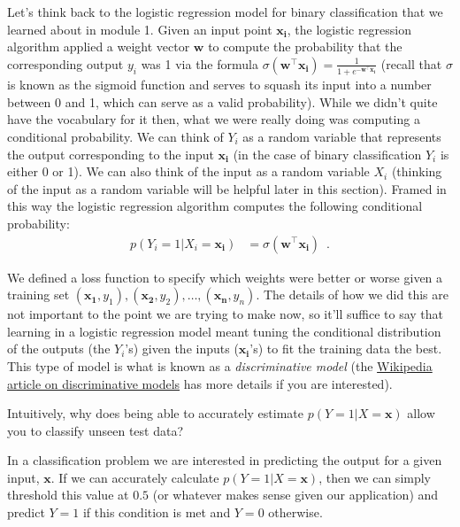\documentclass[assignment03_Solutions]{subfiles}
\begin{document}
Let's think back to the logistic regression model for binary classification that we learned about in module 1.  Given an input point $\mathbf{x_i}$, the logistic regression algorithm applied a weight vector $\mathbf{w}$ to compute the probability that the corresponding output $y_i$ was 1 via the formula $\sigma(\mathbf{w}^\top \mathbf{x_i}) = \frac{1}{1+e^{-\mathbf{w}^\top \mathbf{x_i}}}$ (recall that $\sigma$ is known as the sigmoid function and serves to squash its input into a number between 0 and 1, which can serve as a valid probability).  While we didn't quite have the vocabulary for it then, what we were really doing was computing a conditional probability.  We can think of $Y_i$ as a random variable that represents the output corresponding to the input $\mathbf{x_i}$ (in the case of binary classification $Y_i$ is either 0 or 1).  We can also think of the input as a random variable $X_i$ (thinking of the input as a random variable will be helpful later in this section).  Framed in this way the logistic regression algorithm computes the following conditional probability:
\begin{align}
p(Y_i = 1 | X_i = \mathbf{x_i}) &= \sigma(\mathbf{w}^\top \mathbf{x_i}) \enspace .
\end{align}

We defined a loss function to specify which weights were better or worse given a training set $(\mathbf{x_1}, y_1), (\mathbf{x_2}, y_2), \ldots, (\mathbf{x_n}, y_n)$.  The details of how we did this are not important to the point we are trying to make now, so it'll suffice to say that learning in a logistic regression model meant tuning the conditional distribution of the outputs (the $Y_i$'s) given the inputs ($\mathbf{x_i}$'s) to fit the training data the best.  This type of model is what is known as a \emph{discriminative model} (the \href{https://en.wikipedia.org/wiki/Discriminative_model}{Wikipedia article on discriminative models} has more details if you are interested).

\vspace{1em}

\begin{understandingcheck}
Intuitively, why does being able to accurately estimate $p(Y = 1 | X = \mathbf{x})$ allow you to classify unseen test data?

\begin{boxedsolution}
In a classification problem we are interested in predicting the output for a given input, $\mathbf{x}$.  If we can accurately calculate $p(Y=1|X = \mathbf{x})$, then we can simply threshold this value at $0.5$ (or whatever makes sense given our application) and predict $Y = 1$ if this condition is met and $Y = 0$ otherwise.
\end{boxedsolution}
\end{understandingcheck}
\end{document}
